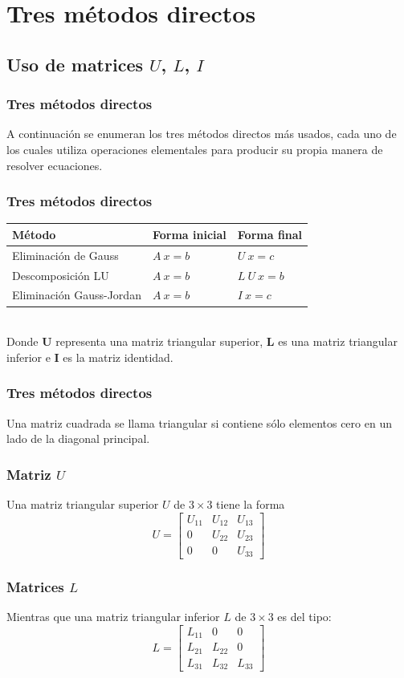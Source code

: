 \section{Tres métodos directos}
\subsection{Uso de matrices \texorpdfstring{$U$}{}, \texorpdfstring{$L$}{}, \texorpdfstring{$I$}{}}
\begin{frame}
\frametitle{Tres métodos directos}
A continuación se enumeran los tres métodos directos más usados, cada uno de los cuales utiliza operaciones elementales para producir su propia manera de resolver ecuaciones.
\end{frame}
\begin{frame}
\frametitle{Tres métodos directos}
\fontsize{12}{12}\selectfont
\begin{tabular}{l l l}
Método & Forma inicial & Forma final \\ \hline
Eliminación de Gauss & $A \: x = b$ & $U\: x = c$ \\
Descomposición LU & $A \: x = b$ & $L\: U\: x = b$ \\
Eliminación Gauss-Jordan & $A \: x = b$ & $I \: x = c$
\end{tabular}
\\
\bigskip
\fontsize{14}{14}\selectfont
Donde $\mathbf{U}$ representa una matriz triangular superior, $\mathbf{L}$ es una matriz triangular inferior e $\mathbf{I}$ es la matriz identidad. 
\end{frame}
\begin{frame}
\frametitle{Tres métodos directos}
Una matriz cuadrada se llama triangular si contiene sólo elementos cero en un lado de la diagonal principal.
\end{frame}
\begin{frame}
\frametitle{Matriz $U$}
Una matriz triangular superior $U$ de $3 \times 3$  tiene la forma
\[ U = \begin{bmatrix}
U_{11} & U_{12} & U_{13} \\
0 & U_{22} & U_{23} \\
0 & 0 & U_{33}
\end{bmatrix} \]
\end{frame}
\begin{frame}
\frametitle{Matrices $L$}
Mientras que una matriz triangular inferior $L$ de $3 \times 3$ es del tipo:
\[ L = \begin{bmatrix}
L_{11} & 0 & 0 \\
L_{21} & L_{22} & 0 \\
L_{31} & L_{32} & L_{33}
\end{bmatrix} \]
\end{frame}
